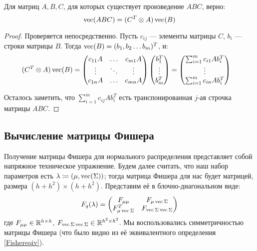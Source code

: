 \begin{theorem}Для матриц $A, B, C$, для которых существует произведение $ABC$, верно:
\begin{equation}\label{kronecker_vect}
\operatorname{vec} (ABC) = (C^T \otimes A)\operatorname{vec}(B)
\end{equation}
\begin{proof} Проверяется непосредственно. Пусть $c_{ij}$ --- элементы матрицы $C$, $b_i$ --- строки матрицы $B$. Тогда $\operatorname{vec}(B) = (b_1, b_2 \dots b_m)^T$, и:
\begin{align*}(C^T \otimes A)\operatorname{vec}(B) &=
\begin{pmatrix}
c_{11}A & \dots & c_{m1}A \\
\vdots & \ddots & \vdots \\
c_{1n}A & \dots & c_{mn}A
\end{pmatrix}
\begin{pmatrix}
b_1^T \\
\vdots\\
b_m^T
\end{pmatrix}
=
\begin{pmatrix}
\sum_{i=1}^{m} c_{i1}Ab_i^T \\
\vdots \\
\sum_{i=1}^{m} c_{in}Ab_i^T \\
\end{pmatrix}
\end{align*}

Осталось заметить, что $\sum_{i=1}^{m} c_{ij}Ab_i^T$ есть транспонированная $j$-ая строчка матрицы $ABC$.
\end{proof}
\end{theorem}

\subsection{Вычисление матрицы Фишера}

Получение матрицы Фишера для нормального распределения представляет собой напряжное техническое упражнение. Будем далее считать, что наш набор параметров есть $\lambda \coloneqq (\mu, \operatorname{vec}(\Sigma))$; тогда матрица Фишера для нас будет матрицей, размера $(h + h^2) \times (h + h^2)$. Представим её в блочно-диагональном виде:
$$F_q(\lambda) =
\begin{pmatrix}
F_{\mu \mu} & F_{\mu \operatorname{vec}{\Sigma}} \\
F_{\mu \operatorname{vec}{\Sigma}}^T & F_{\operatorname{vec}{\Sigma} \operatorname{vec}{\Sigma}}
\end{pmatrix}
$$
где $F_{\mu \mu} \in \mathbb{R}^{h \times h}$, $F_{\operatorname{vec}{\Sigma} \operatorname{vec}{\Sigma}} \in \mathbb{R}^{h^2 \times h^2}$. Мы воспользовались симметричностью матрицы Фишера (что было видно из её эквивалентного определения \eqref{Fishereqiv}).

